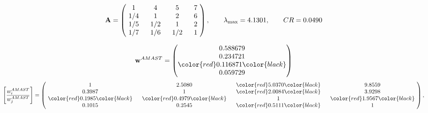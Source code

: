 \begin{example}
\begin{equation*}
\mathbf{A} =
\begin{pmatrix}
$\,\,$ 1 $\,\,$ & $\,\,$4$\,\,$ & $\,\,$5$\,\,$ & $\,\,$7 $\,\,$ \\
$\,\,$ 1/4$\,\,$ & $\,\,$ 1 $\,\,$ & $\,\,$2$\,\,$ & $\,\,$6 $\,\,$ \\
$\,\,$ 1/5$\,\,$ & $\,\,$ 1/2$\,\,$ & $\,\,$ 1 $\,\,$ & $\,\,$2 $\,\,$ \\
$\,\,$ 1/7$\,\,$ & $\,\,$ 1/6$\,\,$ & $\,\,$ 1/2$\,\,$ & $\,\,$ 1  $\,\,$ \\
\end{pmatrix},
\qquad
\lambda_{\max} =
4.1301,
\qquad
CR = 0.0490
\end{equation*}

\begin{equation*}
\mathbf{w}^{AMAST} =
\begin{pmatrix}
0.588679\\
0.234721\\
\color{red} 0.116871\color{black} \\
0.059729
\end{pmatrix}\end{equation*}
\begin{equation*}
\left[ \frac{{w}^{AMAST}_i}{{w}^{AMAST}_j} \right] =
\begin{pmatrix}
$\,\,$ 1 $\,\,$ & $\,\,$2.5080$\,\,$ & $\,\,$\color{red} 5.0370\color{black} $\,\,$ & $\,\,$9.8559$\,\,$ \\
$\,\,$0.3987$\,\,$ & $\,\,$ 1 $\,\,$ & $\,\,$\color{red} 2.0084\color{black} $\,\,$ & $\,\,$3.9298  $\,\,$ \\
$\,\,$\color{red} 0.1985\color{black} $\,\,$ & $\,\,$\color{red} 0.4979\color{black} $\,\,$ & $\,\,$ 1 $\,\,$ & $\,\,$\color{red} 1.9567\color{black}  $\,\,$ \\
$\,\,$0.1015$\,\,$ & $\,\,$0.2545$\,\,$ & $\,\,$\color{red} 0.5111\color{black} $\,\,$ & $\,\,$ 1  $\,\,$ \\
\end{pmatrix},
\end{equation*}


\end{example}
